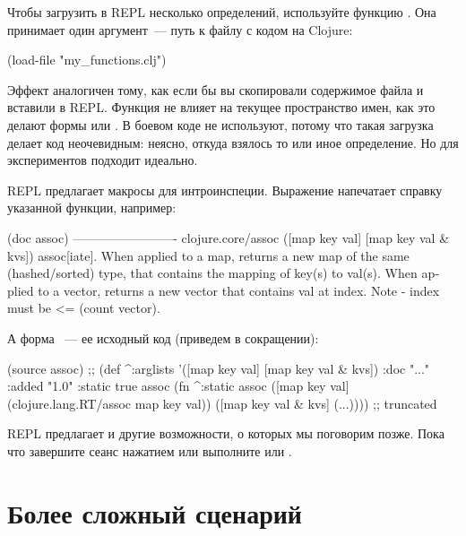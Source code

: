 Чтобы загрузить в REPL несколько определений, используйте функцию . Она принимает один аргумент~--- путь к файлу с кодом на Clojure:

\begin{english}
  \begin{clojure}
(load-file "my_functions.clj")
  \end{clojure}
\end{english}

Эффект аналогичен тому, как если бы вы скопировали содержимое файла и вставили в REPL. Функция не влияет на текущее пространство имен, как это делают формы  или . В боевом коде  не используют, потому что такая загрузка делает код неочевидным: неясно, откуда взялось то или иное определение. Но для экспериментов  подходит идеально.

REPL предлагает макросы для интроинспеции. Выражение  напечатает справку указанной функции, например:

\begin{english}
  \begin{text}
(doc assoc)
-------------------------
clojure.core/assoc
([map key val] [map key val & kvs])
  assoc[iate]. When applied to a map, returns a new map of the
    same (hashed/sorted) type, that contains the mapping of key(s) to
    val(s). When applied to a vector, returns a new vector that
    contains val at index. Note - index must be <= (count vector).
  \end{text}
\end{english}

А форма ~--- ее исходный код (приведем в сокращении):

\begin{english}
  \begin{clojure}
(source assoc)
;;
(def
 ^{:arglists '([map key val] [map key val & kvs])
   :doc "..."
   :added "1.0"
   :static true}
 assoc
 (fn ^:static assoc
   ([map key val] (clojure.lang.RT/assoc map key val))
   ([map key val & kvs]
    (...)))) ;; truncated
  \end{clojure}
\end{english}

REPL предлагает и другие возможности, о которых мы поговорим позже. Пока что завершите сеанс нажатием  или выполните  или .

\section{Более сложный сценарий}

